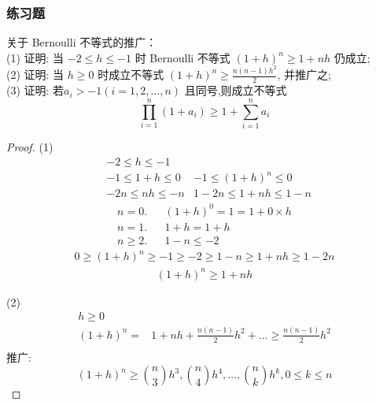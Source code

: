 \subsubsection{练习题}
\begin{example}	关于 Bernoulli 不等式的推广：\\	
	(1) 证明: 当 $ -2 \leqslant h \leqslant -1 $ 时 Bernoulli 不等式 $ (1+h)^n \ge 1+nh $ 仍成立;\\
	(2) 证明: 当 $ h \ge 0 $ 时成立不等式 $ (1+h)^n \ge \frac{n(n-1)h^2}{2} $, 并推广之;\\
	(3) 证明: 若$ a_i > -1(i = 1,2,\dots,n) $ 且同号,则成立不等式
	\[\prod_{i=1}^{n}(1+a_i) \ge 1 + \sum_{i=1}^n a_i \]
	\begin{proof}
		(1)			
		\begin{align*}
			& -2 \leqslant h \leqslant -1  & \\
			& -1 \leqslant 1+h\leqslant 0  & -1 \leqslant (1+h)^n \leqslant 0 \\
			& -2n \leqslant nh \leqslant -n& 1-2n \leqslant 1+nh\leqslant 1-n
		\end{align*}	
		\begin{align*}
			n=0. && (1+h)^0 = 1 = 1 + 0\times h\\
			n=1. && 1+h = 1+h\\
			n \ge 2. && 1-n \leqslant -2
		\end{align*}	
		\begin{align*}
			0 \ge (1+h)^n \ge -1 \ge -2 \ge 1-n \ge 1+nh \ge 1-2n
		\end{align*}	
		\begin{align*}		
			(1+h)^n \ge 1+nh
	 	\end{align*}
	
		(2)
		\begin{align*}
			h\ge 0&\\
			(1+h)^n = &1+nh+\frac{n(n-1)}{2}h^2 + \dots \ge \frac{n(n-1)}{2}h^2\\
		\end{align*}
		推广:
		\begin{equation*}
			(1+h)^n \ge \binom{n}{3}h^3, \binom{n}{4}h^4, \dots, \binom{n}{k}h^k, 0\leqslant k \leqslant n
		\end{equation*}
		

\end{proof}
\end{example}
